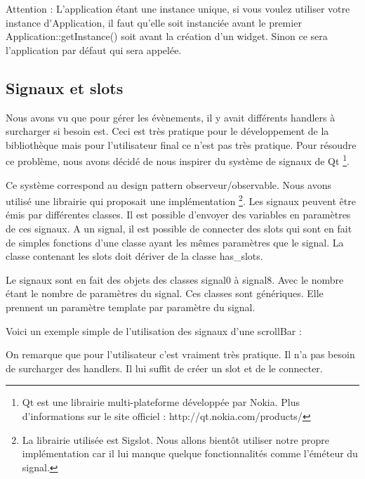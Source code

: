 Attention : L'application étant une instance unique, si vous voulez utiliser votre instance d'Application, il faut qu'elle soit instanciée avant le premier Application::getInstance() soit avant la création d'un widget.
Sinon ce sera l'application par défaut qui sera appelée.

\subsection{Signaux et slots}

Nous avons vu que pour gérer les évènements, il y avait différents handlers à surcharger si besoin est.
Ceci est très pratique pour le développement de la bibliothèque mais pour l'utilisateur final ce n'est pas très pratique.
Pour résoudre ce problème, nous avons décidé de nous inspirer du système de signaux de Qt
\footnote{Qt est une librairie multi-plateforme développée par Nokia. Plus d'informations sur le site officiel : http://qt.nokia.com/products/}.

Ce système correspond au design pattern observeur/observable.
Nous avons utilisé une librairie qui proposait une implémentation
\footnote{La librairie utilisée est Sigslot. Nous allons bientôt utiliser notre propre implémentation car il lui manque quelque fonctionnalités comme l'éméteur du signal.}.
Les signaux peuvent être émis par différentes classes.
Il est possible d'envoyer des variables en paramètres de ces signaux.
A un signal, il est possible de connecter des slots qui sont en fait de simples fonctions d'une classe ayant les mêmes paramètres que le signal.
La classe contenant les slots doit dériver de la classe has\_slots.

Le signaux sont en fait des objets des classes signal0 à signal8. Avec le nombre étant le nombre de paramètres du signal.
Ces classes sont génériques.
Elle prennent un paramètre template par paramètre du signal.

Voici un exemple simple de l'utilisation des signaux d'une scrollBar :



On remarque que pour l'utilisateur c'est vraiment très pratique. Il n'a pas besoin de surcharger des handlers.
Il lui suffit de créer un slot et de le connecter.
